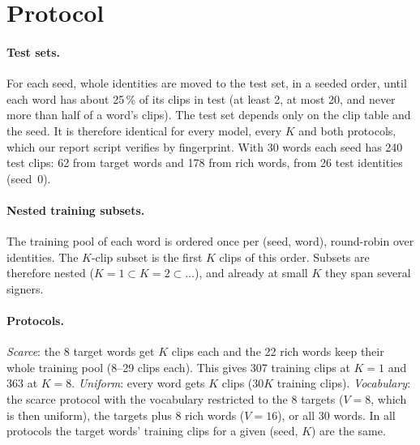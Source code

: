 \documentclass[11pt]{article}
\begin{document}
\section{Protocol}\label{sec:protocol}

\paragraph{Test sets.}
For each seed, whole identities are moved to the test set, in a seeded order, until each word
has about 25\,\% of its clips in test (at least 2, at most 20, and never more than half of a
word's clips). The test set depends only on the clip table and the seed. It is therefore
identical for every model, every $K$ and both protocols, which our report script verifies by
fingerprint. With 30 words each seed has 240 test clips: 62 from target words and 178 from
rich words, from 26 test identities (seed~0).

\paragraph{Nested training subsets.}
The training pool of each word is ordered once per (seed, word), round-robin over
identities. The $K$-clip subset is the first $K$ clips of this order. Subsets are therefore
nested ($K{=}1\subset K{=}2\subset\dots$), and already at small $K$ they span several signers.

\paragraph{Protocols.}
\emph{Scarce}: the 8 target words get $K$ clips each and the 22 rich words keep their whole
training pool (8--29 clips each). This gives 307 training clips at $K{=}1$ and 363 at $K{=}8$.
\emph{Uniform}: every word gets $K$ clips ($30K$ training clips). \emph{Vocabulary}: the
scarce protocol with the vocabulary restricted to the 8 targets ($V{=}8$, which is then
uniform), the targets plus 8 rich words ($V{=}16$), or all 30 words. In all protocols the
target words' training clips for a given (seed, $K$) are the same.
\end{document}
